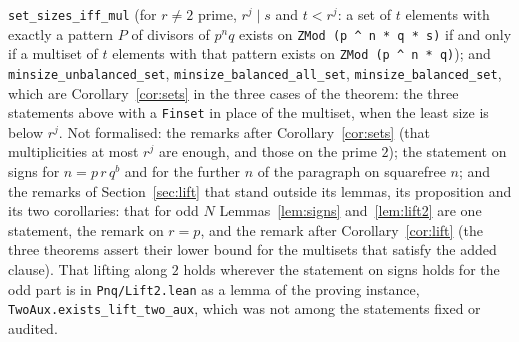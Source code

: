 \documentclass[11pt,a4paper]{amsart}
\theoremstyle{definition}
\theoremstyle{remark}
\newcommand{\lean}[1]{\texttt{#1}}
\begin{document}
\lean{set\_sizes\_iff\_mul} (for $r\ne2$ prime, $r^j\mid s$ and $t<r^j$: a set of $t$ elements with exactly a pattern $P$ of divisors of $p^nq$ exists on \lean{ZMod (p \^{} n * q * s)} if and only if a multiset of $t$ elements with that pattern exists on \lean{ZMod (p \^{} n * q)}); and
\lean{minsize\_unbalanced\_set}, \lean{minsize\_balanced\_all\_set}, \lean{minsize\_balanced\_set}, which are Corollary~\ref{cor:sets} in the three cases of the theorem: the three statements above with a \lean{Finset} in place of the multiset, when the least size is below $r^j$.
Not formalised: the remarks after Corollary~\ref{cor:sets} (that multiplicities at most $r^j$ are enough, and those on the prime $2$); the statement on signs for $n=p\,r\,q^b$ and for the further $n$ of the paragraph on squarefree $n$; and the remarks of Section~\ref{sec:lift} that stand outside its lemmas, its proposition and its two corollaries: that for odd $N$ Lemmas~\ref{lem:signs} and~\ref{lem:lift2} are one statement, the remark on $r=p$, and the remark after Corollary~\ref{cor:lift} (the three theorems assert their lower bound for the multisets that satisfy the added clause). That lifting along $2$ holds wherever the statement on signs holds for the odd part is in \lean{Pnq/Lift2.lean} as a lemma of the proving instance, \lean{TwoAux.exists\_lift\_two\_aux}, which was not among the statements fixed or audited.
\end{document}
